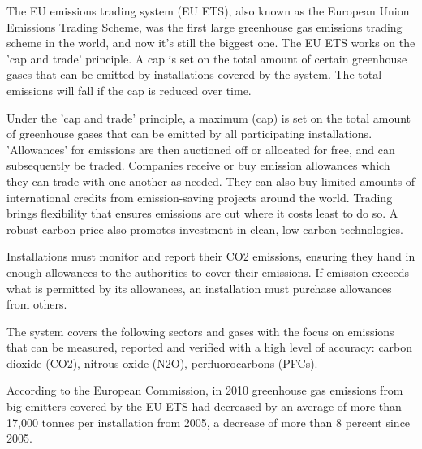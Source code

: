 The EU emissions trading system (EU ETS)\cite{EU-ETS}, also known as the European Union Emissions Trading Scheme, 
was the first large greenhouse gas emissions trading scheme in the world, and now it's still the biggest one. 
The EU ETS works on the 'cap and trade' principle. A cap is set on the total amount of certain greenhouse gases 
that can be emitted by installations covered by the system. The total emissions will fall if the cap is reduced 
over time. 

Under the 'cap and trade' principle, a maximum (cap) is set on the total amount of greenhouse gases that can be 
emitted by all participating installations. 'Allowances' for emissions are then auctioned off or allocated for 
free, and can subsequently be traded. Companies receive or buy emission allowances which they can trade with one 
another as needed. They can also buy limited amounts of international credits from emission-saving projects around 
the world. Trading brings flexibility that ensures emissions are cut where it costs least to do so. A robust carbon 
price also promotes investment in clean, low-carbon technologies.

Installations must monitor and report their CO2 emissions, ensuring they hand in enough allowances to the authorities 
to cover their emissions. If emission exceeds what is permitted by its allowances, an installation must purchase 
allowances from others.

The system covers the following sectors and gases with the focus on emissions that can be measured, reported 
and verified with a high level of accuracy: carbon dioxide (CO2), nitrous oxide (N2O), perfluorocarbons (PFCs).

According to the European Commission, in 2010 greenhouse gas emissions from big emitters covered by the EU ETS 
had decreased by an average of more than 17,000 tonnes per installation from 2005, a decrease of more than 8 percent since 2005.